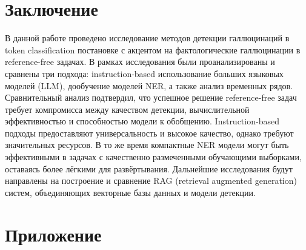 \documentclass[12pt]{article}
\begin{document}
 
\section{Заключение}

В данной работе проведено исследование методов детекции галлюцинаций в token classification постановке с акцентом на фактологические галлюцинации в reference-free задачах. В рамках исследования были проанализированы и сравнены три подхода: instruction-based использование больших языковых моделей (LLM), дообучение моделей NER, а также анализ временных рядов. Сравнительный анализ подтвердил, что успешное решение reference-free задач требует компромисса между качеством детекции, вычислительной эффективностью и способностью модели к обобщению. Instruction-based подходы предоставляют универсальность и высокое качество, однако требуют значительных ресурсов. В то же время компактные NER модели могут быть эффективными в задачах с качественно размеченными обучающими выборками, оставаясь более лёгкими для развёртывания. Дальнейшие исследования будут направлены на построение и сравнение RAG (retrieval augmented generation) систем, объединяющих векторные базы данных и модели детекции.

\nocite{*}



 
\section{Приложение}
\end{document}
